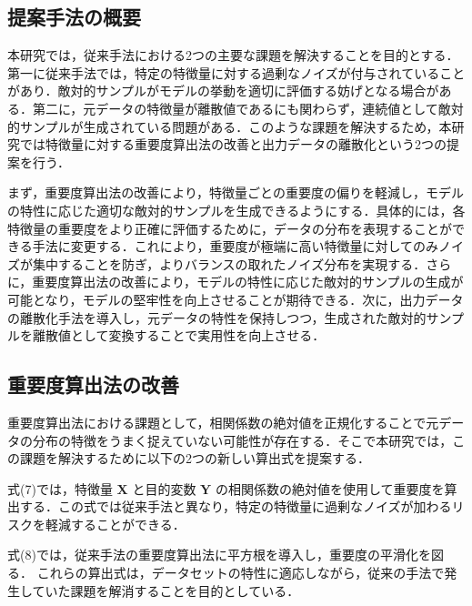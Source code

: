 \subsection{提案手法の概要}
本研究では，従来手法における2つの主要な課題を解決することを目的とする．第一に従来手法では，特定の特徴量に対する過剰なノイズが付与されていることがあり．敵対的サンプルがモデルの挙動を適切に評価する妨げとなる場合がある．第二に，元データの特徴量が離散値であるにも関わらず，連続値として敵対的サンプルが生成されている問題がある．このような課題を解決するため，本研究では特徴量に対する重要度算出法の改善と出力データの離散化という2つの提案を行う．

まず，重要度算出法の改善により，特徴量ごとの重要度の偏りを軽減し，モデルの特性に応じた適切な敵対的サンプルを生成できるようにする．具体的には，各特徴量の重要度をより正確に評価するために，データの分布を表現することができる手法に変更する．これにより，重要度が極端に高い特徴量に対してのみノイズが集中することを防ぎ，よりバランスの取れたノイズ分布を実現する．さらに，重要度算出法の改善により，モデルの特性に応じた敵対的サンプルの生成が可能となり，モデルの堅牢性を向上させることが期待できる．次に，出力データの離散化手法を導入し，元データの特性を保持しつつ，生成された敵対的サンプルを離散値として変換することで実用性を向上させる．

\subsection{重要度算出法の改善}
重要度算出法における課題として，相関係数の絶対値を正規化することで元データの分布の特徴をうまく捉えていない可能性が存在する．そこで本研究では，この課題を解決するために以下の2つの新しい算出式を提案する．


式(7)では，特徴量 $\bm{X}$ と目的変数 $\bm{Y}$ の相関係数の絶対値を使用して重要度を算出する．この式では従来手法と異なり，特定の特徴量に過剰なノイズが加わるリスクを軽減することができる．

式(8)では，従来手法の重要度算出法に平方根を導入し，重要度の平滑化を図る．
これらの算出式は，データセットの特性に適応しながら，従来の手法で発生していた課題を解消することを目的としている．

